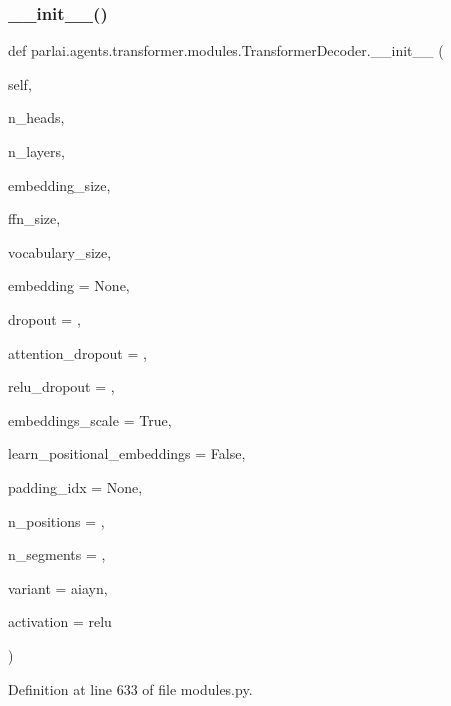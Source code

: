 \subsubsection{\texorpdfstring{\+\_\+\+\_\+init\+\_\+\+\_\+()}{\_\_init\_\_()}}
{\footnotesize\ttfamily def parlai.\+agents.\+transformer.\+modules.\+Transformer\+Decoder.\+\_\+\+\_\+init\+\_\+\+\_\+ (\begin{DoxyParamCaption}\item[{}]{self,  }\item[{}]{n\+\_\+heads,  }\item[{}]{n\+\_\+layers,  }\item[{}]{embedding\+\_\+size,  }\item[{}]{ffn\+\_\+size,  }\item[{}]{vocabulary\+\_\+size,  }\item[{}]{embedding = {\ttfamily None},  }\item[{}]{dropout = {},  }\item[{}]{attention\+\_\+dropout = {},  }\item[{}]{relu\+\_\+dropout = {},  }\item[{}]{embeddings\+\_\+scale = {\ttfamily True},  }\item[{}]{learn\+\_\+positional\+\_\+embeddings = {\ttfamily False},  }\item[{}]{padding\+\_\+idx = {\ttfamily None},  }\item[{}]{n\+\_\+positions = {},  }\item[{}]{n\+\_\+segments = {},  }\item[{}]{variant = {\ttfamily \textquotesingle{}aiayn\textquotesingle{}},  }\item[{}]{activation = {\ttfamily \textquotesingle{}relu\textquotesingle{}} }\end{DoxyParamCaption})}



Definition at line 633 of file modules.\+py.


